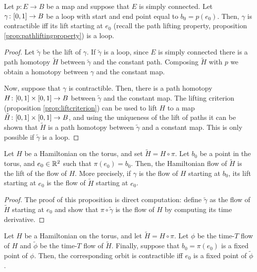 \begin{prop}
Let $p \colon E \to B$ be a map and suppose that $E$ is simply connected. Let $\gamma \colon \interval01 \to B$ be a loop with start and end point equal to $b_0 = p(e_0)$. Then, $\gamma$ is contractible iff its lift starting at $e_0$ (recall the path lifting property, proposition \ref{prop:pathliftingproperty}) is a loop.
\end{prop}

\begin{proof}
Let $\tilde \gamma$ be the lift of $\gamma$. If $\tilde \gamma$ is a loop, since $E$ is simply connected there is a path homotopy $\tilde H$ between $\tilde \gamma$ and the constant path. Composing $\tilde H$ with $p$ we obtain a homotopy between $\gamma$ and the constant map.

Now, suppose that $\gamma$ is contractible. Then, there is a path homotopy $H \colon \interval01 \times \interval01 \to B$ between $\tilde \gamma$ and the constant map. The lifting criterion (proposition \ref{prop:liftcriterion}) can be used to lift $H$ to a map $\tilde H \colon \interval01 \times \interval01 \to B$, and using the uniqueness of the lift of paths it can be shown that $\tilde H$ is a path homotopy between $\tilde \gamma$ and a constant map. This is only possible if $\tilde \gamma$ is a loop.
\end{proof}

\begin{prop}
Let $H$ be a Hamiltonian on the torus, and set $\tilde H = H \circ \pi$. Let $b_0$ be a point in the torus, and $e_0 \in \mathbb{R}^2$ such that $\pi(e_0) = b_0$. Then, the Hamiltonian flow of $\tilde H$ is the lift of the flow of $H$. More precisely, if $\gamma$ is the flow of $H$ starting at $b_0$, its lift starting at $e_0$ is the flow of $\tilde H$ starting at $e_0$.
\end{prop}

\begin{proof}
The proof of this proposition is direct computation: define $\tilde \gamma$ as the flow of $\tilde H$ starting at $e_0$ and show that $\pi \circ \tilde \gamma$ is the flow of $H$ by computing its time derivative.
\end{proof}

\begin{corollary}\label{cor:liftham}
Let $H$ be a Hamiltonian on the torus, and let $\tilde H = H \circ \pi$. Let $\phi$ be the time-$T$ flow of $H$ and $\tilde \phi$ be the time-$T$ flow of $\tilde H$. Finally, suppose that $b_0 = \pi(e_0)$ is a fixed point of $\phi$. Then, the corresponding orbit is contractible iff $e_0$ is a fixed point of $\tilde\phi$.
\end{corollary}

